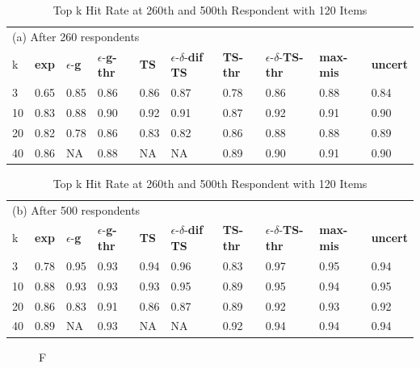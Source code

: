 \documentclass[nonblindrev]{informs3}
\newcommand{\fixedexpressS}{\textbf{exp}}
\newcommand{\egreedyS}{$\epsilon$-\textbf{g}}
\newcommand{\egreedythresS}{$\epsilon$-\textbf{g-thr}}
\newcommand{\misminS}{\textbf{max-mis}}
\newcommand{\tsS}{\textbf{TS} }
\newcommand{\edtsS}{$\epsilon$-$\delta$-\textbf{dif TS} }
\newcommand{\tsthresS}{\textbf{TS-thr} }
\newcommand{\edtsthresS}{$\epsilon$-$\delta$-\textbf{TS-thr} }
\newcommand{\uncertS}{\textbf{uncert} }
\begin{document}
\begin{table}
\caption{Top k Hit Rate at 260th and 500th Respondent with 120 Items}
\label{table:at_260_500}
\begin{center}
\begin{tabular}{llllllllll}
\hline 
\hline
\multicolumn{10}{l}{(a) After 260 respondents}\\
k &  \fixedexpressS&\egreedyS&\egreedythresS&\tsS&\edtsS&\tsthresS&\edtsthresS& \misminS& \uncertS \\ \hline
  3 & 0.65 &   0.85 &  0.86 &   0.86 & 0.87 & 0.78 & 0.86 &    0.88 &   0.84 \\
  10 &  0.83 &   0.88 & 0.90 &   0.92 & 0.91 & 0.87 & 0.92 &    0.91 &   0.90 \\
  20 & 0.82 & 0.78 &  0.86 & 0.83 & 0.82 & 0.86 & 0.88 &  0.88 &   0.89 \\  
  40 &  0.86 &   NA &  0.88 &  NA & NA & 0.89 & 0.90 &  0.91 &   0.90 \\
\hline
\hline
\end{tabular}
\begin{tabular}{llllllllll}
\multicolumn{10}{l}{(b) After 500 respondents}\\
k &  \fixedexpressS&\egreedyS&\egreedythresS&\tsS&\edtsS&\tsthresS&\edtsthresS& \misminS& \uncertS  \\
\hline
   3 & 0.78 &   0.95 & 0.93 & 0.94 & 0.96 & 0.83 & 0.97 &    0.95 &   0.94 \\
  10 &  0.88 &   0.93 &  0.93 &   0.93 & 0.95 & 0.89 & 0.95 &    0.94 &   0.95 \\  
  20 &  0.86 &   0.83 & 0.91 &  0.86 & 0.87 & 0.89 & 0.92 &  0.93 &   0.92 \\ 
  40 &  0.89 &   NA & 0.93 & NA & NA & 0.92 &  0.94 & 0.94 & 0.94 \\
\hline 
\hline
\end{tabular}
\end{center}
\end{table}



\begin{figure}%
    \caption{F}%
    \label{fig:winapprox_thresh_hit20}%
 	\begin{center}
    \subfloat[Top 20]{}%
    \qquad
	\end{center}
\end{figure}
\end{document}
